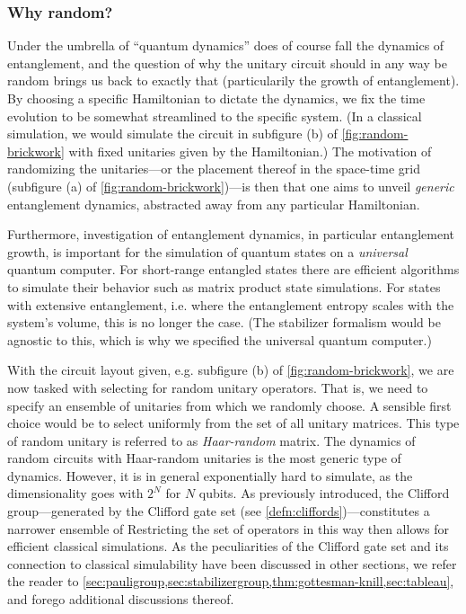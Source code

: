 \subsubsection{Why random?}

Under the umbrella of \enquote{quantum dynamics} does of course fall
the dynamics of entanglement, and the question of why the unitary circuit
should in any way be random brings us back to exactly that (particularily the
growth of entanglement). By choosing a
specific Hamiltonian to dictate the dynamics, we fix the time evolution to be
somewhat streamlined to the specific system. (In a classical simulation, we
would simulate the circuit in subfigure (b) of \cref{fig:random-brickwork} with
fixed unitaries given by the Hamiltonian.) The motivation of randomizing the
unitaries---or the placement thereof in the space-time grid (subfigure (a) of
\cref{fig:random-brickwork})---is then that one aims to unveil
\emph{generic} entanglement dynamics, abstracted away from any particular
Hamiltonian.

Furthermore, investigation of entanglement dynamics, in
particular entanglement growth, is important for the simulation of quantum
states on a \emph{universal} quantum computer. For short-range entangled states
there are efficient algorithms to simulate their behavior such as matrix
product state simulations. For states with extensive entanglement, i.e. where
the entanglement entropy scales with the system's volume, this is no
longer the case. (The stabilizer formalism would be agnostic to this, which is
why we specified the universal quantum computer.)

With the circuit layout given, e.g. subfigure (b) of
\cref{fig:random-brickwork}, we are now tasked with selecting for random
unitary operators. That is, we need to specify an ensemble of unitaries from
which we randomly choose. A sensible first choice would be to select uniformly
from the set of all unitary matrices. This type of random unitary is referred
to as \emph{Haar-random} matrix. The dynamics of random circuits with
Haar-random unitaries is the most generic type of dynamics. However, it is in
general exponentially hard to simulate, as the dimensionality goes with $2^N$
for $N$ qubits. As previously introduced, the Clifford group---generated by the
Clifford gate set (see \cref{defn:cliffords})---constitutes a narrower ensemble of
Restricting the set of operators in this way then allows for
efficient classical simulations. As the peculiarities of the Clifford gate set
and its connection to classical simulability have been discussed in other
sections, we refer the reader to
\cref{sec:pauligroup,sec:stabilizergroup,thm:gottesman-knill,sec:tableau}, and
forego additional discussions thereof. 

